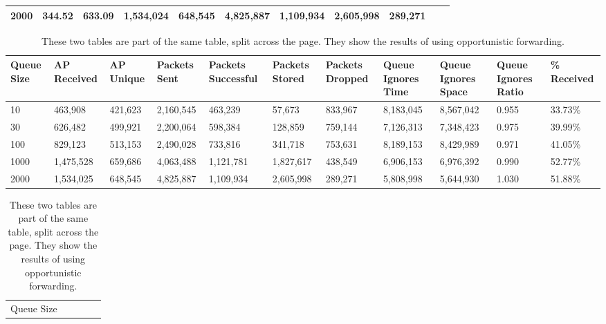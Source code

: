 {\begin{landscape}
\begin{table}
\begin{tabularx}{\linewidth}{|X|X|X|X|X|X|X|X|X|X|X|}
                        2000 & 344.52 & 633.09 & 1,534,024 & 648,545 & 4,825,887 & 1,109,934 & 2,605,998 & 289,271 \\
                        \hline
                    \end{tabularx}
                \end{table}
                \begin{table}
                    \centering
                    \begin{tabularx}{\linewidth}{|X|X|X|X|X|X|X|X|X|X|X|}
                        \hline
                        \multicolumn{1}{|X|}{\centering Queue Size} & \multicolumn{1}{|X|}{\centering AP Received} & \multicolumn{1}{|X|}{\centering AP Unique} & \multicolumn{1}{|X|}{\centering Packets Sent} & \multicolumn{1}{|X|}{\centering Packets Successful} & \multicolumn{1}{|X|}{\centering Packets Stored} & \multicolumn{1}{|X|}{\centering Packets Dropped} & \multicolumn{1}{|X|}{\centering Queue Ignores Time} & \multicolumn{1}{|X|}{\centering Queue Ignores Space} & \multicolumn{1}{|X|}{\centering Queue Ignores Ratio} & \multicolumn{1}{|X|}{\centering \% Received} \\
                        \hline
                        10 & 463,908 & 421,623 & 2,160,545 & 463,239 & 57,673 & 833,967 & 8,183,045 & 8,567,042 & 0.955 & 33.73\% \\
                        30 & 626,482 & 499,921 & 2,200,064 & 598,384 & 128,859 & 759,144 & 7,126,313 & 7,348,423 & 0.975 & 39.99\% \\
                        100 & 829,123 & 513,153 & 2,490,028 & 733,816 & 341,718 & 753,631 & 8,189,153 & 8,429,989 & 0.971 & 41.05\% \\
                        1000 & 1,475,528 & 659,686 & 4,063,488 & 1,121,781 & 1,827,617 & 438,549 & 6,906,153 & 6,976,392 & 0.990 & 52.77\% \\
                        2000 & 1,534,025 & 648,545 & 4,825,887 & 1,109,934 & 2,605,998 & 289,271 & 5,808,998 & 5,644,930 & 1.030 & 51.88\% \\
                        \hline
                    \end{tabularx}
                    \caption{These two tables are part of the same table, split across the page. They show the results of using opportunistic forwarding.}
                    \label{tab:opportunistic_forwarding_first}
                    \begin{tabularx}{0.6\linewidth}{|X|X|X|X|X|}
                        \hline
                        \multicolumn{1}{|X|}{\centering Queue Size} & 

\end{tabularx}
\end{table}
\end{landscape}}
